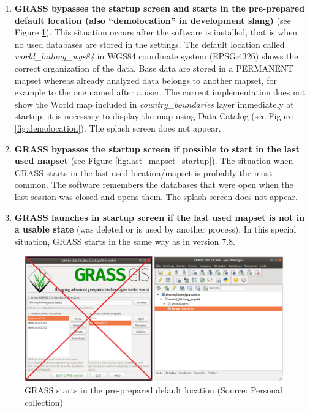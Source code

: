 \documentclass[a4paper,10pt,twoside]{article}
\begin{document}
\begin{enumerate}

\item \textbf{GRASS bypasses the startup screen and starts in the
    pre-prepared default location (also ``demolocation'' in
    development slang)} (see Figure
  \ref{fig:demolocation_startup}). This situation occurs after the
  software is installed, that is when no used databases are stored in
  the settings. The default location called
  \textit{world\_latlong\_wgs84} in WGS84 coordinate system
  (EPSG:4326) shows the correct organization of the data. Base data
  are stored in a PERMANENT mapset whereas already analyzed data
  belongs to another mapset, for example to the one named after a
  user. The current implementation does not show the World map
  included in \textit{country\_boundaries} layer immediately at
  startup, it is necessary to display the map using Data Catalog (see
  Figure \ref{fig:demolocation}). The splash screen does not appear.
\item\textbf{ GRASS bypasses the startup screen if possible to start
    in the last used mapset} (see Figure
  \ref{fig:last_mapset_startup}). The situation when GRASS starts in 
  the last used location/mapset is probably the most common. 
  The software remembers the databases that were open when the
  last session was closed and opens them.  The splash screen does not
  appear.
\item \textbf{GRASS launches in startup screen if the last used mapset
 is not in a usable state} (was deleted or is used by another process). 
 In this special situation, GRASS starts in the same way as in version 7.8.

\end{enumerate}

\vspace{0.3cm}
\begin{figure}[hbt!] 
\begin{center}
\includegraphics[width=17cm]{../pictures/demolocation_startup.png} 
\caption[GRASS starts in the pre-prepared default location]{GRASS starts in the pre-prepared default location (Source: Personal collection)}
\label{fig:demolocation_startup}
\end{center}
\end{figure}
\end{document}
